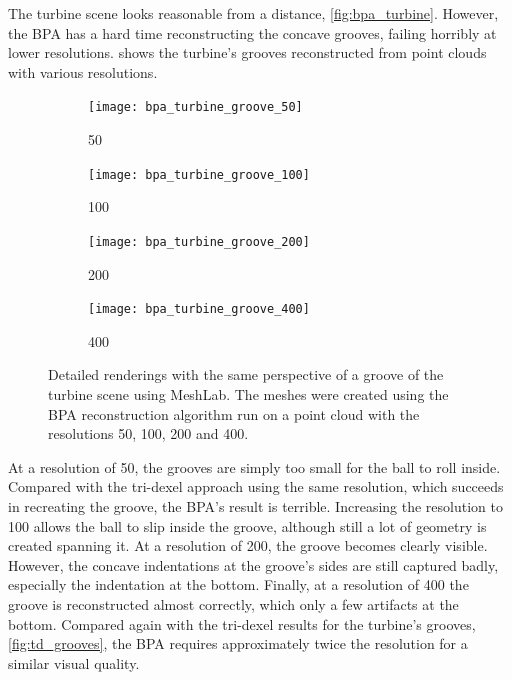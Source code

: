The turbine scene looks reasonable from a distance, \cf \cref{fig:bpa_turbine}.
However, the BPA has a hard time reconstructing the concave grooves, failing horribly at lower resolutions.
 shows the turbine's grooves reconstructed from point clouds with various resolutions.
%
\begin{figure}
	\centering
	\begin{subfigure}[b]{0.24\textwidth}
		\centering
		\texttt{[image: bpa\_turbine\_groove\_50]}
		\caption{50}
		\label{fig:bpa_turbine_groove_50}
	\end{subfigure}
	\begin{subfigure}[b]{0.24\textwidth}
		\centering
		\texttt{[image: bpa\_turbine\_groove\_100]}
		\caption{100}
		\label{fig:bpa_turbine_groove_100}
	\end{subfigure}
	\begin{subfigure}[b]{0.24\textwidth}
		\centering
		\texttt{[image: bpa\_turbine\_groove\_200]}
		\caption{200}
		\label{fig:bpa_turbine_groove_200}
	\end{subfigure}
	\begin{subfigure}[b]{0.24\textwidth}
		\centering
		\texttt{[image: bpa\_turbine\_groove\_400]}
		\caption{400}
		\label{fig:bpa_turbine_groove_400}
	\end{subfigure}
	\caption{
		Detailed renderings with the same perspective of a groove of the turbine scene using MeshLab.
		The meshes were created using the BPA reconstruction algorithm run on a point cloud with the resolutions 50, 100, 200 and 400.
	}
	\label{fig:bpa_grooves}
\end{figure}
%
At a resolution of 50, the grooves are simply too small for the ball to roll inside.
Compared with the tri-dexel approach using the same resolution, which succeeds in recreating the groove, the BPA's result is terrible.
Increasing the resolution to 100 allows the ball to slip inside the groove, although still a lot of geometry is created spanning it.
At a resolution of 200, the groove becomes clearly visible.
However, the concave indentations at the groove's sides are still captured badly, especially the indentation at the bottom.
Finally, at a resolution of 400 the groove is reconstructed almost correctly, which only a few artifacts at the bottom.
Compared again with the tri-dexel results for the turbine's grooves, \cf \cref{fig:td_grooves}, the BPA requires approximately twice the resolution for a similar visual quality.

